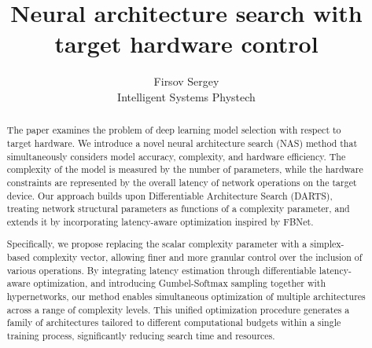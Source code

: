 \documentclass{article}
\title{Neural architecture search with target hardware control}
\author{Firsov Sergey\\
        Intelligent Systems Phystech}
\begin{document}
\maketitle

\begin{abstract}
The paper examines the problem of deep learning model selection with respect to target hardware. We introduce a novel neural architecture search (NAS) method that simultaneously considers model accuracy, complexity, and hardware efficiency. The complexity of the model is measured by the number of parameters, while the hardware constraints are represented by the overall latency of network operations on the target device. Our approach builds upon Differentiable Architecture Search (DARTS), treating network structural parameters as functions of a complexity parameter, and extends it by incorporating latency-aware optimization inspired by FBNet.

Specifically, we propose replacing the scalar complexity parameter with a simplex-based complexity vector, allowing finer and more granular control over the inclusion of various operations. By integrating latency estimation through differentiable latency-aware optimization, and introducing Gumbel-Softmax sampling together with hypernetworks, our method enables simultaneous optimization of multiple architectures across a range of complexity levels. This unified optimization procedure generates a family of architectures tailored to different computational budgets within a single training process, significantly reducing search time and resources.

\end{abstract}
\end{document}
